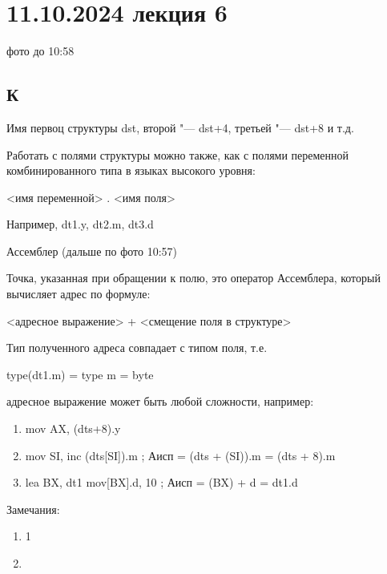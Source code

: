 \section{11.10.2024 лекция 6}
фото до 10:58
\subsection{К}
Имя первоц структуры dst, второй "--- dst+4, третьей "--- dst+8 и т.д.

Работать с полями структуры можно также, как с полями переменной комбинированного типа в языках высокого уровня:
\begin{center}
    <имя переменной> . <имя поля>
\end{center}
Например, dt1.y, dt2.m, dt3.d 

Ассемблер (дальше по фото 10:57)

Точка, указанная при обращении к полю, это оператор Ассемблера, который вычисляет адрес по формуле:
\begin{center}
    <адресное выражение> + <смещение поля в структуре>
\end{center}
Тип полученного адреса совпадает с типом поля, т.е.
\begin{center}
    type(dt1.m) = type m = byte
\end{center}
адресное выражение может быть любой сложности, например:
\begin{enumerate}
    \item mov AX, (dts+8).y
    \item mov SI,
    inc (dts[SI]).m ; Аисп = (dts + (SI)).m = (dts + 8).m
    \item lea BX, dt1
    mov[BX].d, 10   ; Аисп = (BX) + d = dt1.d
\end{enumerate}

Замечания:
\begin{enumerate}
    \item  1
    \item 
\end{enumerate}

